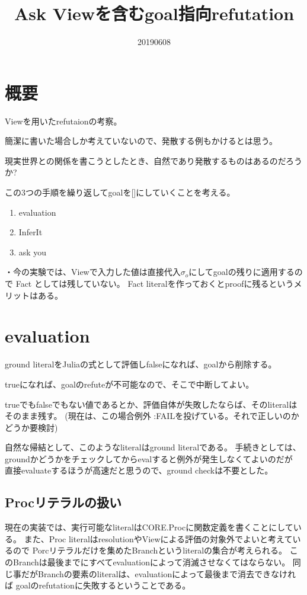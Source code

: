 \documentclass[10pt, onecolumn]{jarticle}   	%
\title{Ask Viewを含むgoal指向refutation}
\author{\myname}
\date{20190608}					%
\begin{document}
\maketitle

\section{概要}
Viewを用いたrefutaionの考察。

簡潔に書いた場合しか考えていないので、発散する例もかけるとは思う。

現実世界との関係を書こうとしたとき、自然であり発散するものはあるのだろうか?

この3つの手順を繰り返してgoalを[]にしていくことを考える。

\begin{enumerate}
\item evaluation
\item InferIt
\item ask you
\end{enumerate}


・今の実験では、Viewで入力した値は直接代入$\sigma_o$にしてgoalの残りに適用するので
Fact としては残していない。
Fact literalを作っておくとproofに残るというメリットはある。

\section{evaluation}
ground literalをJuliaの式として評価しfalseになれば、goalから削除する。

trueになれば、goalのrefuteが不可能なので、そこで中断してよい。

trueでもfalseでもない値であるとか、評価自体が失敗したならば、そのliteralはそのまま残す。
(現在は、この場合例外 :FAILを投げている。それで正しいのかどうか要検討)

 自然な帰結として、このようなliteralはground literalである。
 手続きとしては、groundかどうかをチェックしてからevalすると例外が発生しなくてよいのだが
 直接evaluateするほうが高速だと思うので、ground checkは不要とした。

\subsection{Procリテラルの扱い}
現在の実装では、実行可能なliteralはCORE.Procに関数定義を書くことにしている。
また、Proc literalはresolutionやViewによる評価の対象外でよいと考えているので
Porcリテラルだけを集めたBranchというliteralの集合が考えられる。
このBranchは最後までにすべてevaluationによって消滅させなくてはならない。
同じ事だがBranchの要素のliteralは、evaluationによって最後まで消去できなければ
goalのrefutationに失敗するということである。
\end{document}
